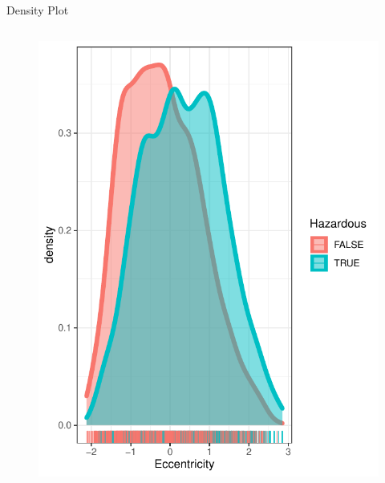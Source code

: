 \documentclass{beamer}
\begin{document}
\begin{frame}{Density Plot}
\begin{columns}
\begin{figure}[b]{\textwidth}
    \includegraphics[width=\textwidth]{Pic/DENSITY_Eccentricity.pdf}
    \vspace{4ex}
  \end{figure}
\end{columns}
\end{frame}
\end{document}
